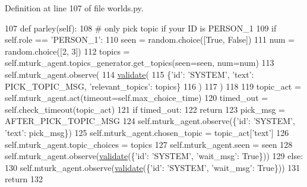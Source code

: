 Definition at line 107 of file worlds.\+py.


\begin{DoxyCode}
107     \textcolor{keyword}{def }parley(self):
108         \textcolor{comment}{# only pick topic if your ID is PERSON\_1}
109         \textcolor{keywordflow}{if} self.role == \textcolor{stringliteral}{'PERSON\_1'}:
110             seen = random.choice([\textcolor{keyword}{True}, \textcolor{keyword}{False}])
111             num = random.choice([2, 3])
112             topics = self.mturk\_agent.topics\_generator.get\_topics(seen=seen, num=num)
113             self.mturk\_agent.observe(
114                 \hyperlink{namespaceparlai_1_1core_1_1worlds_afc3fad603b7bce41dbdc9cdc04a9c794}{validate}(
115                     \{\textcolor{stringliteral}{'id'}: \textcolor{stringliteral}{'SYSTEM'}, \textcolor{stringliteral}{'text'}: PICK\_TOPIC\_MSG, \textcolor{stringliteral}{'relevant\_topics'}: topics\}
116                 )
117             )
118 
119             topic\_act = self.mturk\_agent.act(timeout=self.max\_choice\_time)
120             timed\_out = self.check\_timeout(topic\_act)
121             \textcolor{keywordflow}{if} timed\_out:
122                 \textcolor{keywordflow}{return}
123             pick\_msg = AFTER\_PICK\_TOPIC\_MSG
124             self.mturk\_agent.observe(\{\textcolor{stringliteral}{'id'}: \textcolor{stringliteral}{'SYSTEM'}, \textcolor{stringliteral}{'text'}: pick\_msg\})
125             self.mturk\_agent.chosen\_topic = topic\_act[\textcolor{stringliteral}{'text'}]
126             self.mturk\_agent.topic\_choices = topics
127             self.mturk\_agent.seen = seen
128             self.mturk\_agent.observe(\hyperlink{namespaceparlai_1_1core_1_1worlds_afc3fad603b7bce41dbdc9cdc04a9c794}{validate}(\{\textcolor{stringliteral}{'id'}: \textcolor{stringliteral}{'SYSTEM'}, \textcolor{stringliteral}{'wait\_msg'}: \textcolor{keyword}{True}\}))
129         \textcolor{keywordflow}{else}:
130             self.mturk\_agent.observe(\hyperlink{namespaceparlai_1_1core_1_1worlds_afc3fad603b7bce41dbdc9cdc04a9c794}{validate}(\{\textcolor{stringliteral}{'id'}: \textcolor{stringliteral}{'SYSTEM'}, \textcolor{stringliteral}{'wait\_msg'}: \textcolor{keyword}{True}\}))
131         \textcolor{keywordflow}{return}
132 
\end{DoxyCode}



